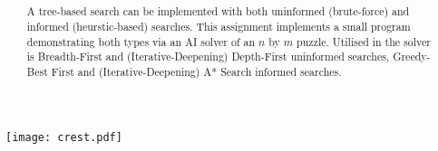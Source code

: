 \author
{
  { \authorname }
  { \small \scshape \studentid }
}
\date { \doccdate }
\title
{
  { \doctitle                         } \\
  { \slshape \normalsize \unitdesc    } \\
  { \scshape \normalsize \university  }
}

\maketitle

\begin{center}
  \texttt{[image: crest.pdf]}
\end{center}

\begin{abstract}
  A tree-based search can be implemented with both uninformed (brute-force) and
  informed (heurstic-based) searches. This assignment implements a small program
  demonstrating both types via an AI solver of an $n$ by $m$ puzzle. Utilised
  in the solver is Breadth-First and (Iterative-Deepening) Depth-First uninformed
  searches, Greedy-Best First and (Iterative-Deepening) A* Search informed
  searches.
\end{abstract}
